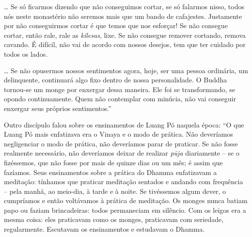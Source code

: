 \ldots{} Se só ficarmos dizendo que não conseguimos cortar, se só
falarmos nisso, todos nós neste monastério não seremos mais que um bando
de cafajestes. Justamente por não conseguirmos cortar é que temos que
nos esforçar! Se não consegue cortar, então rale, rale as
\emph{kilesas}, lixe. Se não consegue remover cortando, remova cavando.
É difícil, não vai de acordo com nossos desejos, tem que ter cuidado por
todos os lados.

\ldots{} Se não opusermos nossos sentimentos agora, hoje, ser uma pessoa
ordinária, um delinquente, continuará algo fixo dentro de nossa
personalidade. O Buddha tornou-se um monge por enxergar dessa maneira.
Ele foi se transformando, se opondo continuamente. Quem não contemplar
com minúcia, não vai conseguir enxergar seus próprios sentimentos.''

Outro discípulo falou sobre os ensinamentos de Luang Pó naquela época:
``O que Luang Pó mais enfatizava era o Vinaya e o modo de prática. Não
deveríamos negligenciar o modo de prática, não deveríamos parar de
praticar. Se não fosse realmente necessário, não deveríamos deixar de
realizar \emph{pūja} diariamente -- se o fizéssemos, que não fosse por
mais de quinze dias ou um mês; é assim que fazíamos. Seus ensinamentos
sobre a prática do Dhamma enfatizavam a meditação: tínhamos que praticar
meditação sentados e andando com frequência -- pela manhã, ao meio-dia,
à tarde e à noite. Se tivéssemos algum dever, o cumpríamos e então
voltávamos à prática de meditação. Os monges nunca batiam papo ou faziam
brincadeiras: todos permaneciam em silêncio. Com os leigos era a mesma
coisa: eles praticavam como os monges, praticavam com seriedade,
regularmente. Escutavam os ensinamentos e estudavam o Dhamma.

